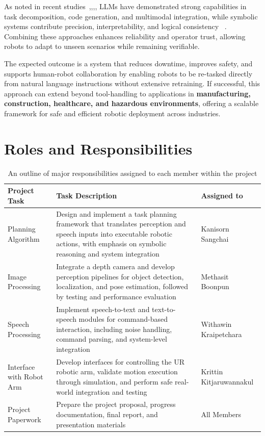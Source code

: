 \documentclass[12pt]{extarticle}
\begin{document}
As noted in recent studies~\cite{enhancing-interpret},\cite{learning-neuro-symbolic},\cite{code-as-symbolic-planner},\cite{code-as-policies}, LLMs have demonstrated strong capabilities in task decomposition, code generation, and multimodal integration, while symbolic systems contribute precision, interpretability, and logical consistency ~\cite{code-as-symbolic-planner}. Combining these approaches enhances reliability and operator trust, allowing robots to adapt to unseen scenarios while remaining verifiable.

The expected outcome is a system that reduces downtime, improves safety, and supports human-robot collaboration by enabling robots to be re-tasked directly from natural language instructions without extensive retraining. If successful, this approach can extend beyond tool-handling to applications in \textbf{manufacturing, construction, healthcare, and hazardous environments}, offering a scalable framework for safe and efficient robotic deployment across industries.

\newpage
\section{Roles and Responsibilities}

{
\renewcommand{\arraystretch}{1.3} %
\begin{table}[h!]
    \centering
    \begin{tabular}{|l|p{6cm}|l|}
        \hline
        \textbf{Project Task} & \textbf{Task Description} & \textbf{Assigned to} \\
        \hline
        Planning Algorithm & Design and implement a task planning framework that translates perception and speech inputs into executable robotic actions, with emphasis on symbolic reasoning and system integration & Kanisorn Sangchai \\
        \hline
        Image Processing & Integrate a depth camera and develop perception pipelines for object detection, localization, and pose estimation, followed by testing and performance evaluation & Methasit Boonpun \\
        \hline
        Speech Processing & Implement speech-to-text and text-to-speech modules for command-based interaction, including noise handling, command parsing, and system-level integration & Withawin Kraipetchara \\
        \hline
        Interface with Robot Arm & Develop interfaces for controlling the UR robotic arm, validate motion execution through simulation, and perform safe real-world integration and testing & Krittin Kitjaruwannakul \\
        \hline
        Project Paperwork & Prepare the project proposal, progress documentation, final report, and presentation materials & All Members \\
        \hline
    \end{tabular}
    \caption{An outline of major responsibilities assigned to each member within the project}
    \label{tab:roles_responsibilities}
\end{table}
}
\end{document}
